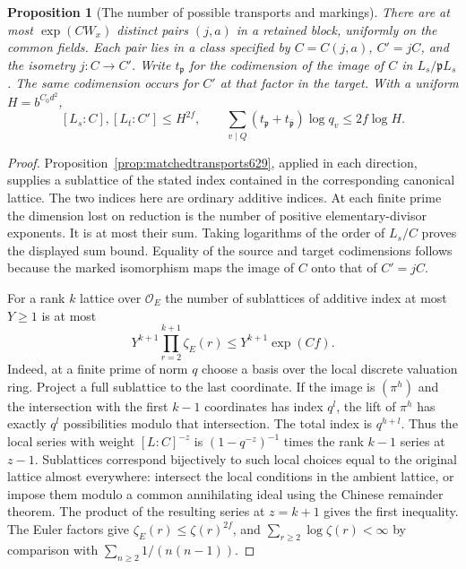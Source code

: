 \documentclass[a4paper,11pt]{article}
\newtheorem{proposition}{Proposition}[section]
\theoremstyle{definition}
\theoremstyle{remark}
\numberwithin{equation}{section}
\begin{document}
\begin{proposition}[The number of possible transports and markings]
\leavevmode\label{prop:transportcount631}
There are at most \(\exp(CW_x)\) distinct pairs \((j,a)\) in a retained
block, uniformly on the common fields. Each pair lies in a class
specified by \(C=C(j,a)\), \(C'=jC\), and the isometry \(j:C\to C'\).
Write \(t_{\mathfrak p}\) for the codimension of the image of \(C\)
in \(L_s/\mathfrak p L_s\). The same codimension occurs for
\(C'\) at that factor in the target. With a uniform \(H=b^{C_0d^2}\),
\[
 [L_s:C], [L_t:C']\le H^{2f},\qquad
 \sum_{v\mid Q}(t_{\mathfrak p}+t_{\bar{\mathfrak p}})\log q_v
                      \le 2f\log H .
\]
\end{proposition}
\begin{proof}
Proposition~\ref{prop:matchedtransports629}, applied in each direction,
supplies a sublattice of the stated index contained in the corresponding
canonical lattice. The two indices here are ordinary additive indices.
At each finite prime the dimension lost on reduction is the number
of positive elementary-divisor exponents. It is at most their sum.
Taking logarithms of the order of \(L_s/C\) proves the displayed
sum bound. Equality of the source and target codimensions follows
because the marked isomorphism maps the image of \(C\) onto that of
\(C'=jC\).

For a rank \(k\) lattice over \(\mathcal O_E\) the number of sublattices
of additive index at most \(Y\ge1\) is at most
\[
       Y^{k+1}\prod_{r=2}^{k+1}\zeta_E(r)\le Y^{k+1}\exp(Cf).
\]
Indeed, at a finite prime of norm \(q\) choose a basis over the local
discrete valuation ring. Project a full sublattice to the last
coordinate. If the image is \((\pi^h)\) and the intersection with
the first \(k-1\) coordinates has index \(q^l\), the lift of
\(\pi^h\) has exactly \(q^l\) possibilities modulo that intersection.
The total index is \(q^{h+l}\). Thus the local series with weight
\([L:C]^{-z}\) is \((1-q^{-z})^{-1}\) times the rank \(k-1\)
series at \(z-1\). Sublattices correspond bijectively to such
local choices equal to the original lattice almost everywhere:
intersect the local conditions in the ambient lattice, or impose
them modulo a common annihilating ideal using the Chinese remainder
theorem. The product of the resulting series at \(z=k+1\) gives
the first inequality. The Euler factors give
\(\zeta_E(r)\le\zeta(r)^{2f}\), and \(\sum_{r\ge2}\log\zeta(r)<\infty\)
by comparison with \(\sum_{n\ge2}1/(n(n-1))\).


\end{proof}
\end{document}
